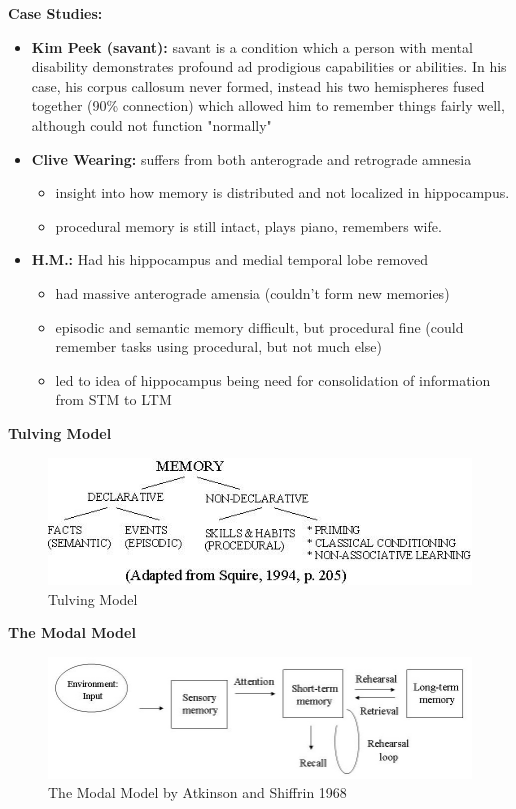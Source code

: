 \documentclass{article}
\begin{document}
\noindent\textbf{Case Studies:}
\begin{itemize}
    \item \textbf{Kim Peek (savant):} savant is a condition which a person with mental disability demonstrates profound ad prodigious capabilities or abilities. In his case, his corpus callosum never formed, instead his two hemispheres fused together (90\% connection) which allowed him to remember things fairly well, although could not function "normally"
    \item \textbf{Clive Wearing:} suffers from both anterograde and retrograde amnesia 
    \begin{itemize}
        \item insight into how memory is distributed and not localized in hippocampus. 
        \item procedural memory is still intact, plays piano, remembers wife. 
    \end{itemize}
    \item \textbf{H.M.:} Had his hippocampus and medial temporal lobe removed
    \begin{itemize}
        \item had massive anterograde amensia (couldn't form new memories) 
        \item episodic and semantic memory difficult, but procedural fine (could remember tasks using procedural, but not much else) 
        \item led to idea of hippocampus being need for consolidation of information from STM to LTM
    \end{itemize}
\end{itemize}

\textbf{Tulving Model}
\begin{figure}[htp]
\centering
\includegraphics[width=\textwidth]{images/tulving_model.jpg}
\caption{Tulving Model}
\label{fig:tulving}
\end{figure}

\bigskip

\textbf{The Modal Model} \\
\begin{figure}[htp]
\centering
\includegraphics[width=\textwidth]{images/modalmodel.jpg}
\caption{The Modal Model by Atkinson and Shiffrin 1968}
\label{fig:modal}
\end{figure}
\end{document}
